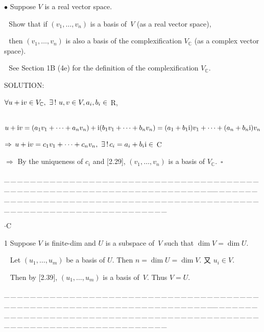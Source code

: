 \documentclass[a4paper, 11pt, UTF8]{article}
\def\i{\textup{i}}
\begin{document}
\begin{large}
{\small $\bullet$} {\timessl\Large 
Suppose $V$ is a real vector space.}\par\,\,
{\timessl\Large Show that if $(v_1,\dots,v_n)$ is a basis of \,$V$ (as a real vector space),}\par\,\,
{\timessl\Large then $(v_1,\dots,v_n)$ is also a basis of the complexification $V_{\mathbb{C}}$ (as a complex vector space).}\par\,\,
{\timessl\small See Section 1B (4e) for the definition of the complexification $V_{\mathbb{C}}$.
}\par
{\timesbf S\footnotesize{OLUTION:}}\par\quad
$\forall u+\i v\in V_{\mathbb{C}},\,\,\exists\,!\,\,u,v\in V,a_i,b_i\in$ {\timesbf R},\par\quad\,
$u+\i v=(a_1 v_1+\dots+a_n v_n)+\i(b_1 v_1+\dots+b_n v_n)=(a_1+b_1\i)v_1+\dots+(a_n+b_n\i)v_n$\par
$\Rightarrow\,u+\i v=c_1 v_1+\dots+c_n v_n,\,\,\exists\,!\,c_i=a_i+b_i\i\in$ {\timesbf C}\par
$\Rightarrow$ By the uniqueness of $c_i$ and [2.29], $(v_1,\dots,v_n)$ is a basis of $V_{\mathbb{C}}.\,\,\,\square$\par
{\tiny \_\,\_\,\_\,\_\,\_\,\_\,\_\,\_\,\_\,\_\,\_\,\_\,\_\,\_\,\_\,\_\,\_\,\_\,\_\,\_\,\_\,\_\,\_\,\_\,\_\,\_\,\_\,\_\,\_\,\_\,\_\,\_\,\_\,\_\,\_\,\_\,\_\,\_\,\_\,\_\,\_\,\_\,\_\,\_\,\_\,\_\,\_\,\_\,\_\,\_\,\_\,\_\,\_\,\_\,\_\,\_\,\_\,\_\,\_\,\_\,\_\,\_\,\_\,\_\,\_\,\_\,\_\,\_\,\_\,\_\,\_\_\,\_\,\_\,\_\,\_\,\_\,\_\,\_\,\_\,\_\,\_\,\_\,\_\,\_\,\_\,\_\,\_\,\_\,\_\,\_\,\_\,\_\,\_\,\_\,\_\,\_\,\_\,\_\,\_\,\_\,\_\,\_\,\_\,\_\,\_\,\_\,\_\,\_\,\_\,\_\,\_\,\_\,\_\,\_\,\_\,\_\,\_\,\_\,\_\,\_\,\_\,\_\,\_\,\_\,\_\,\_\,\_\,\_\,\_\,\_\,\_\,\_\,\_\,\_\,\_\,\_\,\_\,\_\,\_\,\_\,\_}\par
{}\par
{\huge{}$\cdot$C} %

{\timesbf\Large 1} {\timessl\Large 
Suppose $V$ is finite-dim and $U$ is a subspace of \,$V$ such that $\dim V=\dim U$.}\par\,\,\,
Let $(u_1,\dots,u_m)$ be a basis of $U$. Then $n=\dim U=\dim V.$ 又 $u_i\in V$.\par\,\,\,
Then by [2.39], $(u_1,\dots,u_m)$ is a basis of \,$V$. Thus $V=U$.\par
{\tiny \_\,\_\,\_\,\_\,\_\,\_\,\_\,\_\,\_\,\_\,\_\,\_\,\_\,\_\,\_\,\_\,\_\,\_\,\_\,\_\,\_\,\_\,\_\,\_\,\_\,\_\,\_\,\_\,\_\,\_\,\_\,\_\,\_\,\_\,\_\,\_\,\_\,\_\,\_\,\_\,\_\,\_\,\_\,\_\,\_\,\_\,\_\,\_\,\_\,\_\,\_\,\_\,\_\,\_\,\_\,\_\,\_\,\_\,\_\,\_\,\_\,\_\,\_\,\_\,\_\,\_\,\_\,\_\,\_\,\_\,\_\_\,\_\,\_\,\_\,\_\,\_\,\_\,\_\,\_\,\_\,\_\,\_\,\_\,\_\,\_\,\_\,\_\,\_\,\_\,\_\,\_\,\_\,\_\,\_\,\_\,\_\,\_\,\_\,\_\,\_\,\_\,\_\,\_\,\_\,\_\,\_\,\_\,\_\,\_\,\_\,\_\,\_\,\_\,\_\,\_\,\_\,\_\,\_\,\_\,\_\,\_\,\_\,\_\,\_\,\_\,\_\,\_\,\_\,\_\,\_\,\_\,\_\,\_\,\_\,\_\,\_\,\_\,\_\,\_\,\_\,\_}\par


\end{large}
\end{document}
